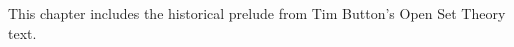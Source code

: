 \documentclass[../../../include/open-logic-chapter]{subfiles}
\begin{document}
	

\begin{editorial}
This chapter includes the historical prelude from Tim Button's Open
Set Theory text.
\end{editorial}

\end{document}
